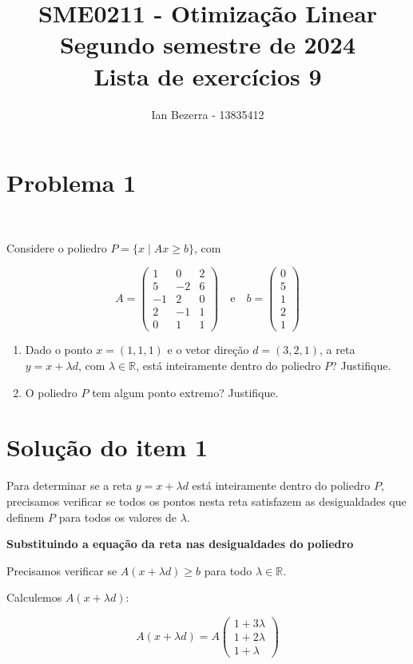 \documentclass{article}
\title{SME0211 - Otimização Linear\\
Segundo semestre de 2024\\ 
Lista de exercícios 9}
\author{Ian Bezerra - 13835412}
\begin{document}
\maketitle

\section*{Problema 1}

\

Considere o poliedro $P = \{x \mid Ax \geq b\}$, com

$$
A = \begin{pmatrix}
1 & 0 & 2 \\
5 & -2 & 6 \\
-1 & 2 & 0 \\
2 & -1 & 1 \\
0 & 1 & 1
\end{pmatrix}
\quad \text{e} \quad
b = \begin{pmatrix}
0 \\
5 \\
1 \\
2 \\
1
\end{pmatrix}
$$

\begin{enumerate}
\item Dado o ponto $x = (1,1,1)$ e o vetor direção $d = (3,2,1)$, a reta $y = x + \lambda d$, com $\lambda \in \mathbb{R}$, está inteiramente dentro do poliedro $P$? Justifique.

\item O poliedro $P$ tem algum ponto extremo? Justifique.
\end{enumerate}

\section*{Solução do item 1}

Para determinar se a reta $y = x + \lambda d$ está inteiramente dentro do poliedro $P$, precisamos verificar se todos os pontos nesta reta satisfazem as desigualdades que definem $P$ para todos os valores de $\lambda$.

\textbf{Substituindo a equação da reta nas desigualdades do poliedro}

Precisamos verificar se $A(x + \lambda d) \geq b$ para todo $\lambda \in \mathbb{R}$.

Calculemos $A(x + \lambda d)$:

$$
A(x + \lambda d) = A \begin{pmatrix}
1 + 3\lambda \\
1 + 2\lambda \\
1 + \lambda
\end{pmatrix}
$$
\end{document}
